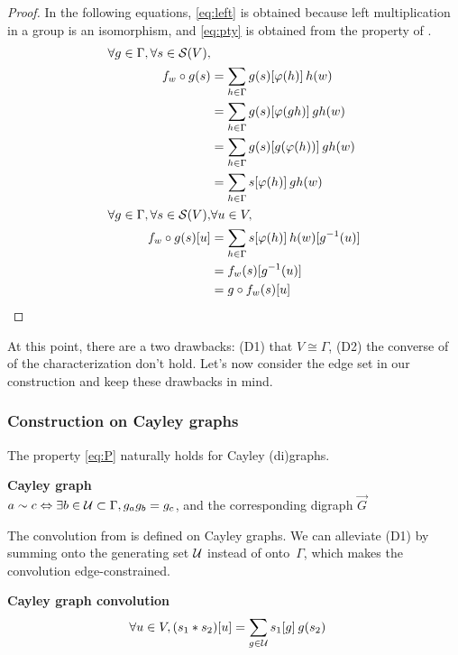 \begin{proof}
In the following equations, \eqref{eq:left} is obtained because left multiplication in a group is an isomorphism, and \eqref{eq:pty} is obtained from the property of .
\begin{align}
\forall g \in \Gamma, \forall s \in \cs(V), & \nonumber\\
f_w \circ g (s) & = \displaystyle \sum_{h \in \Gamma} g(s)[\varphi(h)] \h{2} h(w)\nonumber\\
 & = \displaystyle \sum_{h \in \Gamma} g(s)[\varphi(gh)] \h{2} gh(w)\label{eq:left}\\
 & = \displaystyle \sum_{h \in \Gamma} g(s)[g(\varphi(h))] \h{2} gh(w)\label{eq:pty}\\
 & = \displaystyle \sum_{h \in \Gamma} s[\varphi(h)] \h{2} gh(w)\nonumber\\
\forall g \in \Gamma, \forall s \in \cs(V), & \forall u \in V, \nonumber\\
f_w \circ g (s) [u] & = \displaystyle \sum_{h \in \Gamma} s[\varphi(h)] \h{2} h(w)[g^{-1}(u)]\nonumber\\
& = f_w (s) [g^{-1}(u)]\nonumber\\
& = g \circ f_w (s) [u]\nonumber
\end{align}
\end{proof}

At this point, there are a two drawbacks: (D1) that $V \cong \Gamma$, (D2) the converse of of the characterization don't hold. Let's now consider the edge set in our construction and keep these drawbacks in mind.

\subsubsection{Construction on Cayley graphs}

The property \eqref{eq:P} naturally holds for Cayley (di)graphs.

\begin{definition}\textbf{Cayley graph}\\
$a \sim c \Leftrightarrow \exists b \in \cu \subset \Gamma, g_ag_b = g_c$, and the corresponding digraph $\vec{G}$
\end{definition}

The convolution from  is defined on Cayley graphs. We can alleviate (D1) by summing onto the generating set $\cu$ instead of onto~$\Gamma$, which makes the convolution edge-constrained.

\begin{definition}\textbf{Cayley graph convolution}\\
\begin{align*}
\forall u \in V, (s_1 \ast s_2) [u] & = \displaystyle \sum_{g \in \cu} s_1[g] \h{2} g(s_2)
\end{align*}
\end{definition}


